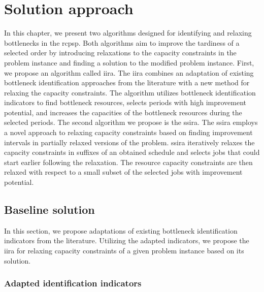 \chapter{Solution approach} \label{chap:solution-apporach}

In this chapter,
we present two algorithms designed for identifying and relaxing bottlenecks in the \ac{rcpsp}.
Both algorithms aim to improve the tardiness of a selected order
by introducing relaxations to the capacity constraints in the problem instance
and finding a solution to the modified problem instance.
First, we propose an algorithm called \acf{iira}.
The \ac{iira} combines an adaptation of existing bottleneck identification approaches from the literature
with a new method for relaxing the capacity constraints.
The algorithm utilizes bottleneck identification indicators to find bottleneck resources,
selects periods with high improvement potential,
and increases the capacities of the bottleneck resources during the selected periods.
The second algorithm we propose is the \acf{ssira}.
The \ac{ssira} employs a novel approach to relaxing capacity constraints
based on finding improvement intervals in partially relaxed versions of the problem.
\ac{ssira} iteratively relaxes the capacity constraints in suffixes of an obtained schedule
and selects jobs that could start earlier following the relaxation.
The resource capacity constraints are then relaxed with respect to a small subset
of the selected jobs with improvement potential.


\section{Baseline solution} \label{sec:solution-apporach/baseline-solution}

In this section, we propose adaptations of existing bottleneck identification indicators from the literature.
Utilizing the adapted indicators, we propose the \ac{iira}
for relaxing capacity constraints of a given problem instance based on its solution.

\subsection{Adapted identification indicators}

